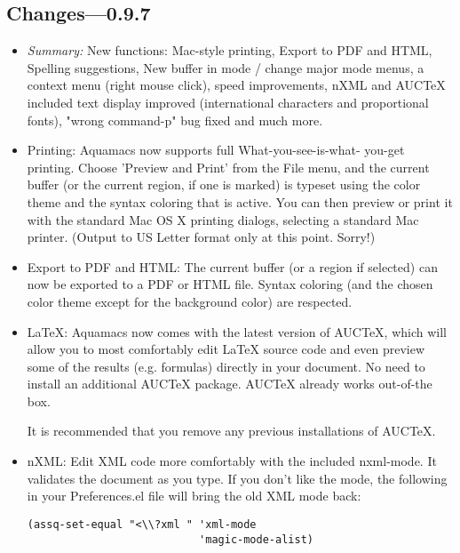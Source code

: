 \subsection{Changes---0.9.7}

\begin{itemize}


\item \emph{Summary:} New functions: Mac-style printing, Export to PDF and
        HTML, Spelling suggestions, New buffer in mode / change major mode
        menus, a context menu (right mouse click), speed improvements,
        nXML and AUCTeX included text display improved (international
        characters and proportional fonts), "wrong command-p" bug fixed
        and much more.


\item Printing: Aquamacs now supports full What-you-see-is-what-
        you-get printing. Choose 'Preview and Print' from the File menu,
        and the current buffer (or the current region, if one is marked)
        is typeset using the color theme and the syntax coloring that is
        active. You can then preview or print it with the standard Mac OS
        X printing dialogs, selecting a standard Mac printer. (Output to
        US Letter format only at this point. Sorry!)

\item Export to PDF and HTML: The current buffer (or a region if
        selected) can now be exported to a PDF or HTML file. Syntax
        coloring (and the chosen color theme except for the background
        color) are respected.

\item LaTeX: Aquamacs now comes with the latest version of
        AUCTeX, which will allow you to most comfortably edit LaTeX source
        code and even preview some of the results (e.g. formulas) directly
        in your document.  No need to install an additional AUCTeX
        package.        AUCTeX already works out-of-the box.

        It is recommended that you remove any previous installations of
        AUCTeX.

\item nXML: Edit XML code more comfortably with the included
        nxml-mode. It validates the document as you type. If you don't
        like the mode, the following in your Preferences.el file will
        bring the old XML mode back:

\begin{verbatim}
(assq-set-equal "<\\?xml " 'xml-mode
                           'magic-mode-alist)
\end{verbatim}


\end{itemize}
